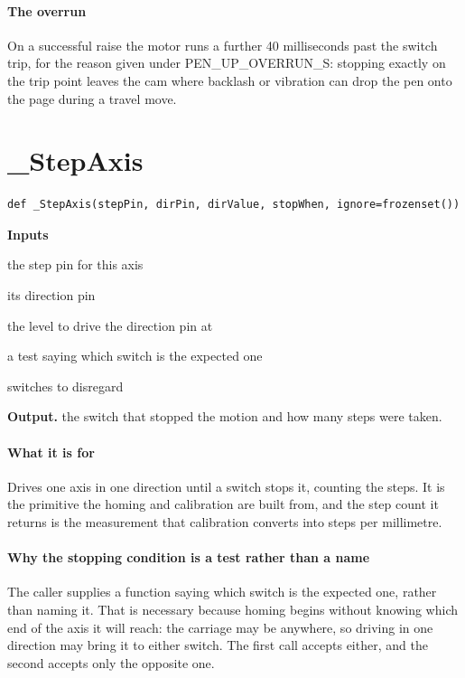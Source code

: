 \paragraph{The overrun}
On a successful raise the motor runs a further 40 milliseconds past the switch trip, for the reason given under PEN\_UP\_OVERRUN\_S: stopping exactly on the trip point leaves the cam where backlash or vibration can drop the pen onto the page during a travel move.


\section{\_StepAxis}
\begin{lstlisting}[style=sig]
def _StepAxis(stepPin, dirPin, dirValue, stopWhen, ignore=frozenset())
\end{lstlisting}

\noindent\textbf{Inputs}
\begin{description}[leftmargin=2.2em,style=nextline,font=\normalfont\ttfamily]\setlength\itemsep{1pt}
  \item[{stepPin}] \normalfont the step pin for this axis
  \item[{dirPin}] \normalfont its direction pin
  \item[{dirValue}] \normalfont the level to drive the direction pin at
  \item[{stopWhen}] \normalfont a test saying which switch is the expected one
  \item[{ignore}] \normalfont switches to disregard
\end{description}

\noindent\textbf{Output.} the switch that stopped the motion and how many steps were taken.


\paragraph{What it is for}
Drives one axis in one direction until a switch stops it, counting the steps. It is the primitive the homing and calibration are built from, and the step count it returns is the measurement that calibration converts into steps per millimetre.


\paragraph{Why the stopping condition is a test rather than a name}
The caller supplies a function saying which switch is the expected one, rather than naming it. That is necessary because homing begins without knowing which end of the axis it will reach: the carriage may be anywhere, so driving in one direction may bring it to either switch. The first call accepts either, and the second accepts only the opposite one.


